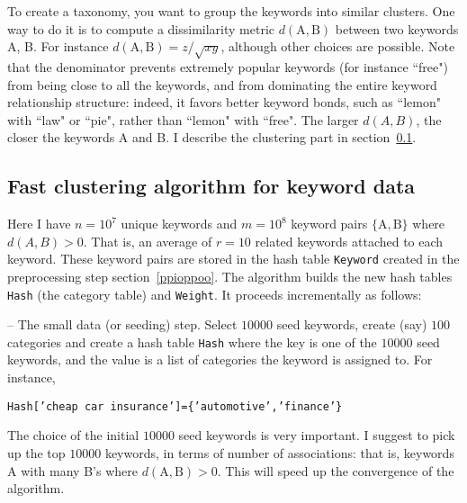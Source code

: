\documentclass[oneside,10pt]{book}
\begin{document}

\noindent To create a taxonomy, you want to group the keywords into similar clusters. One way to do it is to compute a \textcolor{index}{dissimilarity metric}
$d(\text{A}, \text{B})$ between two keywords A, B. For instance $d(\text{A}, \text{B}) = z / \sqrt{xy}$, although other choices are possible. Note that the denominator prevents extremely popular keywords (for instance ``free") from being close to all the keywords, and from dominating the entire keyword relationship structure: indeed, it favors better keyword bonds, such as ``lemon" with ``law" or ``pie", rather than ``lemon" with ``free". The larger $d(A, B)$, the closer the keywords A and B.
I describe the clustering part in section~\ref{cvbsdwq}.



\subsection{Fast clustering algorithm for keyword data}\label{cvbsdwq}


Here  I have $n = 10^7$ unique keywords and $m=10^8$  keyword pairs $\{\text{A}, \text{B}\}$
 where $d(A,B)>0$. That is, an average of $r = 10$ related keywords attached to each keyword. These keyword pairs are stored in the hash table \texttt{Keyword} created in the preprocessing step section~\ref{ppioppoo}.
The algorithm builds the new hash tables \texttt{Hash} (the category table) and \texttt{Weight}. It proceeds incrementally  as follows:\vspace{1ex}



 -- The small data (or seeding) step. Select $\num{10000}$ seed keywords, create (say) $100$ categories and create a hash table \texttt{Hash} where the key is one of the
$\num{10000}$ seed keywords, and the value is a list of categories the keyword is assigned to. For instance,
\begin{center}
\texttt{Hash['cheap car insurance']=\{'automotive','finance'\}}
\end{center}
The choice of the initial $\num{10000}$ seed keywords is very important. I suggest to pick up the top $\num{10000}$ keywords, in terms of number of associations: that is, keywords A with many B's where $d(\text{A}, \text{B}) > 0$. This will speed up the convergence of the algorithm.\vspace{1ex}
\end{document}
